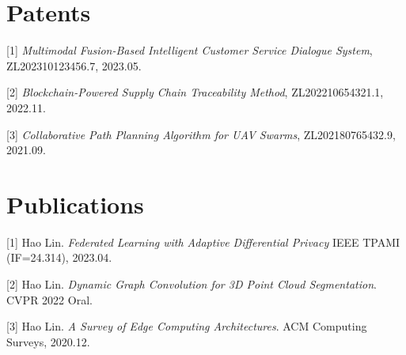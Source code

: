 \documentclass{cls/simplecv}
\begin{document}
\section{Patents}

[1] \emph{Multimodal Fusion-Based Intelligent Customer Service Dialogue System}, ZL202310123456.7, 2023.05.

[2] \emph{Blockchain-Powered Supply Chain Traceability Method}, ZL202210654321.1, 2022.11.

[3] \emph{Collaborative Path Planning Algorithm for UAV Swarms}, ZL202180765432.9, 2021.09.


\section{Publications}
[1] Hao Lin. \emph{Federated Learning with Adaptive Differential Privacy}
IEEE TPAMI (IF=24.314), 2023.04.

[2] Hao Lin. \emph{Dynamic Graph Convolution for 3D Point Cloud Segmentation}. CVPR 2022 Oral.

[3] Hao Lin. \emph{A Survey of Edge Computing Architectures}. ACM Computing Surveys, 2020.12.
\end{document}
